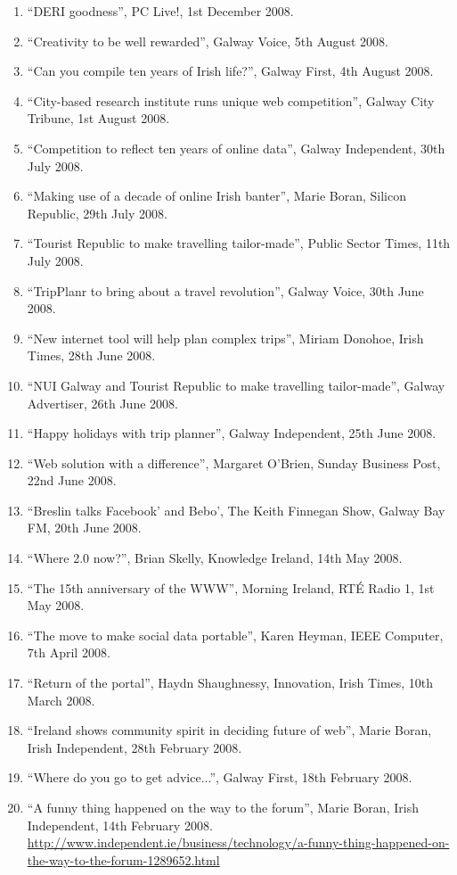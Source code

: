 \documentclass[10pt,a4paper]{res} %
\begin{document}
\begin{resume}
{\begin{enumerate}
\item ``DERI goodness'', PC Live!, 1st December 2008.
\item ``Creativity to be well rewarded'', Galway Voice, 5th August 2008.
\item ``Can you compile ten years of Irish life?'', Galway First, 4th August 2008.
\item ``City-based research institute runs unique web competition'', Galway City Tribune, 1st August 2008.
\item ``Competition to reflect ten years of online data'', Galway Independent, 30th July 2008.
\item ``Making use of a decade of online Irish banter'', Marie Boran, Silicon Republic, 29th July 2008.
\item ``Tourist Republic to make travelling tailor-made'', Public Sector Times, 11th July 2008.
\item ``TripPlanr to bring about a travel revolution'', Galway Voice, 30th June 2008.
\item ``New internet tool will help plan complex trips'', Miriam Donohoe, Irish Times, 28th June 2008.
\item ``NUI Galway and Tourist Republic to make travelling tailor-made'', Galway Advertiser, 26th June 2008.
\item ``Happy holidays with trip planner'', Galway Independent, 25th June 2008.
\item ``Web solution with a difference'', Margaret O'Brien, Sunday Business Post, 22nd June 2008.
\item ``Breslin talks Facebook' and Bebo', The Keith Finnegan Show, Galway Bay FM, 20th June 2008.
\item ``Where 2.0 now?'', Brian Skelly, Knowledge Ireland, 14th May 2008.
\item ``The 15th anniversary of the WWW'', Morning Ireland, RT\'{E} Radio 1, 1st May 2008.
\item ``The move to make social data portable'', Karen Heyman, IEEE Computer, 7th April 2008.
\item ``Return of the portal'', Haydn Shaughnessy, Innovation, Irish Times, 10th March 2008.
\item ``Ireland shows community spirit in deciding future of web'', Marie Boran, Irish Independent, 28th February 2008.
\item ``Where do you go to get advice...'', Galway First, 18th February 2008.
\item ``A funny thing happened on the way to the forum'', Marie Boran, Irish Independent, 14th February 2008. \url{http://www.independent.ie/business/technology/a-funny-thing-happened-on-the-way-to-the-forum-1289652.html}

\end{enumerate}}
\end{resume}
\end{document}
